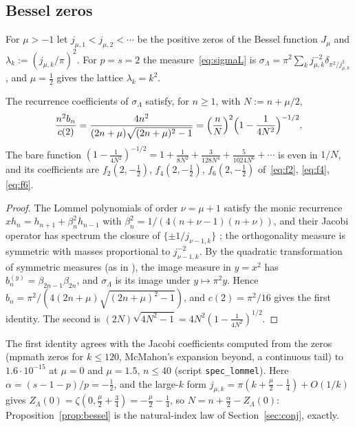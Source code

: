\subsection{Bessel zeros}\label{sec:bessel}
For $\mu>-1$ let $j_{\mu,1}<j_{\mu,2}<\dotsb$ be the positive zeros of the Bessel function $J_\mu$ and
$\lambda_k:=(j_{\mu,k}/\pi)^2$. For $p=s=2$ the measure~\eqref{eq:sigmaL} is
$\sigma_\Lambda=\pi^2\sum_kj_{\mu,k}^{-2}\delta_{\pi^2/j_{\mu,k}^2}$, and $\mu=\frac12$ gives the lattice $\lambda_k=k^2$.

\begin{proposition}\label{prop:bessel}
The recurrence coefficients of $\sigma_\Lambda$ satisfy, for $n\ge1$, with $N:=n+\mu/2$,
\[
  \frac{n^2b_n}{c(2)}=\frac{4n^2}{(2n+\mu)\sqrt{(2n+\mu)^2-1}}=\Bigl(\frac nN\Bigr)^2\Bigl(1-\frac1{4N^2}\Bigr)^{-1/2}.
\]
The bare function $(1-\frac1{4N^2})^{-1/2}=1+\frac1{8N^2}+\frac3{128N^4}+\frac5{1024N^6}+\dotsb$ is even in $1/N$, and its
coefficients are $f_2(2,-\frac12)$, $f_4(2,-\frac12)$, $f_6(2,-\frac12)$ of~\eqref{eq:f2}, \eqref{eq:f4}, \eqref{eq:f6}.
\end{proposition}

\begin{proof}
The Lommel polynomials of order $\nu=\mu+1$ satisfy the monic recurrence $xh_n=h_{n+1}+\beta_n^2h_{n-1}$ with
$\beta_n^2=1/(4(n+\nu-1)(n+\nu))$, and their Jacobi operator has spectrum the closure of $\{\pm1/j_{\nu-1,k}\}$
\cite[\S3]{VA}; the orthogonality measure is symmetric with masses proportional to $j_{\nu-1,k}^{-2}$.
By the quadratic transformation of symmetric measures (as in \cite[Remark~9.6]{PaperII}), the image measure in
$y=x^2$ has $b_n^{(y)}=\beta_{2n-1}\beta_{2n}$, and $\sigma_\Lambda$ is its image under $y\mapsto\pi^2y$. Hence
$b_n=\pi^2/(4(2n+\mu)\sqrt{(2n+\mu)^2-1})$, and $c(2)=\pi^2/16$ gives the first identity. The second is
$(2N)\sqrt{4N^2-1}=4N^2(1-\frac1{4N^2})^{1/2}$.
\end{proof}

The first identity agrees with the Jacobi coefficients computed from the zeros (mpmath zeros for $k\le120$, McMahon's
expansion beyond, a continuous tail) to $1.6\cdot10^{-15}$ at $\mu=0$ and $\mu=1.5$, $n\le40$ (script
\texttt{spec\_lommel}). Here $\alpha=(s-1-p)/p=-\frac12$, and the large-$k$ form
$j_{\mu,k}=\pi(k+\frac\mu2-\frac14)+O(1/k)$ gives $Z_\Lambda(0)=\zeta(0,\frac\mu2+\frac34)=-\frac\mu2-\frac14$, so
$N=n+\frac\alpha2-Z_\Lambda(0)$: Proposition~\ref{prop:bessel} is the natural-index law of Section~\ref{sec:conj},
exactly.

